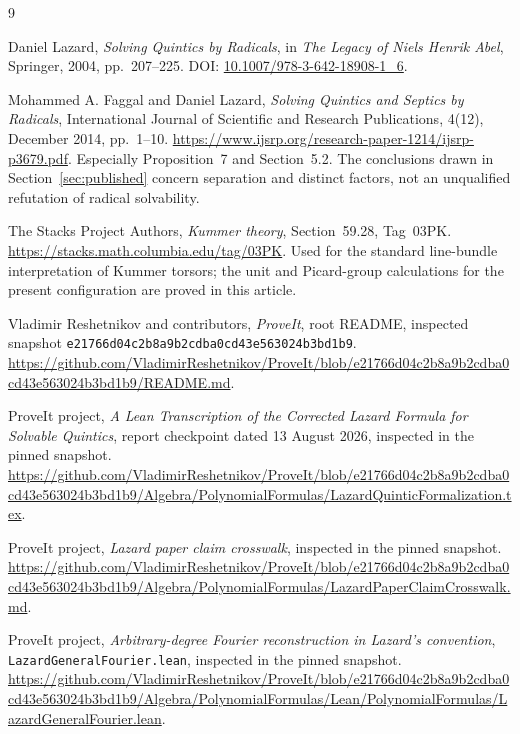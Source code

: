 \documentclass[11pt,a4paper]{article}
\theoremstyle{definition}
\theoremstyle{remark}
\newcommand{\code}[1]{{\small\nolinkurl{#1}}}
\newcommand{\snapshot}{\nolinkurl{e21766d04c2b8a9b2cdba0cd43e563024b3bd1b9}}
\begin{document}
\begin{thebibliography}{9}

Daniel Lazard,
\emph{Solving Quintics by Radicals},
in \emph{The Legacy of Niels Henrik Abel}, Springer, 2004, pp.~207--225.
DOI: \href{https://doi.org/10.1007/978-3-642-18908-1_6}{10.1007/978-3-642-18908-1\_6}.

Mohammed A. Faggal and Daniel Lazard,
\emph{Solving Quintics and Septics by Radicals},
International Journal of Scientific and Research Publications,
4(12), December 2014, pp.~1--10.
\url{https://www.ijsrp.org/research-paper-1214/ijsrp-p3679.pdf}.
Especially Proposition~7 and Section~5.2. The conclusions drawn in
Section~\ref{sec:published} concern separation and distinct factors, not an
unqualified refutation of radical solvability.

The Stacks Project Authors,
\emph{Kummer theory}, Section~59.28, Tag~03PK.
\url{https://stacks.math.columbia.edu/tag/03PK}.
Used for the standard line-bundle interpretation of Kummer torsors; the
unit and Picard-group calculations for the present configuration are
proved in this article.

Vladimir Reshetnikov and contributors,
\emph{ProveIt}, root README, inspected snapshot
\snapshot.
\url{https://github.com/VladimirReshetnikov/ProveIt/blob/e21766d04c2b8a9b2cdba0cd43e563024b3bd1b9/README.md}.

ProveIt project,
\emph{A Lean Transcription of the Corrected Lazard Formula for Solvable
Quintics}, report checkpoint dated 13 August 2026, inspected in the pinned
snapshot.
\url{https://github.com/VladimirReshetnikov/ProveIt/blob/e21766d04c2b8a9b2cdba0cd43e563024b3bd1b9/Algebra/PolynomialFormulas/LazardQuinticFormalization.tex}.

ProveIt project,
\emph{Lazard paper claim crosswalk}, inspected in the pinned snapshot.
\url{https://github.com/VladimirReshetnikov/ProveIt/blob/e21766d04c2b8a9b2cdba0cd43e563024b3bd1b9/Algebra/PolynomialFormulas/LazardPaperClaimCrosswalk.md}.

ProveIt project,
\emph{Arbitrary-degree Fourier reconstruction in Lazard's convention},
\code{LazardGeneralFourier.lean}, inspected in the pinned snapshot.
\url{https://github.com/VladimirReshetnikov/ProveIt/blob/e21766d04c2b8a9b2cdba0cd43e563024b3bd1b9/Algebra/PolynomialFormulas/Lean/PolynomialFormulas/LazardGeneralFourier.lean}.

\end{thebibliography}
\end{document}
